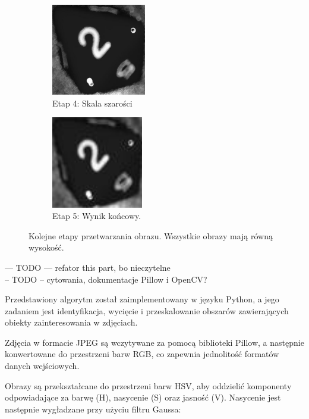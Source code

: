 \begin{figure}[H]
    \begin{subfigure}[t]{0.45\linewidth}
        \centering
        \includegraphics[height=4cm]{chapters/04-czytanie/figures/2_4.jpg}
        \caption{Etap 4: Skala szarości}
        \label{fig:step4}
    \end{subfigure}
    \hfill
    \begin{subfigure}[t]{0.45\linewidth}
        \centering
        \includegraphics[height=4cm]{chapters/04-czytanie/figures/2_5.jpg}
        \caption{Etap 5: Wynik końcowy.}
        \label{fig:step5}
    \end{subfigure}

    \caption{Kolejne etapy przetwarzania obrazu. Wszystkie obrazy mają równą wysokość.}
    \label{fig:preproc_steps}
\end{figure}



--- TODO --- refator this part, bo nieczytelne \\
-- TODO -- cytowania, dokumentacje Pillow i OpenCV?

Przedstawiony algorytm został zaimplementowany w języku Python, a jego zadaniem jest identyfikacja, wycięcie i przeskalowanie obszarów zawierających obiekty zainteresowania w zdjęciach.

Zdjęcia w formacie JPEG są wczytywane za pomocą biblioteki Pillow, a następnie konwertowane do przestrzeni barw RGB, co zapewnia jednolitość formatów danych wejściowych.

Obrazy są przekształcane do przestrzeni barw HSV, aby oddzielić komponenty odpowiadające za barwę (H), nasycenie (S) oraz jasność (V).
Nasycenie jest następnie wygładzane przy użyciu filtru Gaussa:

